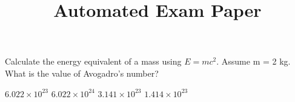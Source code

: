 \documentclass{exam}
\begin{document}
\title{Automated Exam Paper}
\maketitle
\begin{questions}
\question Calculate the energy equivalent of a mass using $E = mc^2$. Assume m = 2 kg.
\vspace{3cm}
\question What is the value of Avogadro's number?
\begin{choices}\choice $6.022 \times 10^{23}$
\choice $6.022 \times 10^{24}$
\choice $3.141 \times 10^{23}$
\choice $1.414 \times 10^{23}$
\end{choices}

\end{questions}
\end{document}
